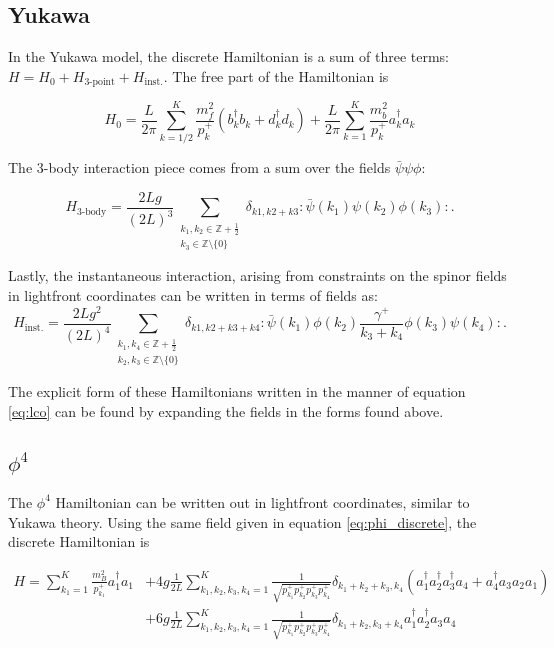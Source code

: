\subsection{Yukawa}
In the Yukawa model, the discrete Hamiltonian is a sum of three terms: $H = H_0 + H_{\text{3-point}} + H_{\text{inst.}}$.
The free part of the Hamiltonian is 

\begin{equation}
    H_0 = \frac{L}{2\pi}\sum_{k = 1/2}^K \frac{m_f^2}{p_k^+}\left(b_k^\dagger b_k + d_k^\dagger d_k \right) + \frac{L}{2\pi}\sum_{k = 1}^K \frac{m_b^2}{p_k^+}a_k^\dagger a_k 
\end{equation}

The 3-body interaction piece comes from a sum over the fields $\bar \psi \psi \phi$:

\begin{equation}
    H_{\text{3-body}} = \frac{2Lg}{(2L)^3}\sum_{\substack{k_1, k_2 \in \mathbb{Z} + \frac{1}{2} \\ k_3 \in \mathbb{Z} \setminus \{0\}}}
    \delta_{k1, k2 + k3}:\bar \psi(k_1)\psi(k_2)\phi(k_3):.
\end{equation}

Lastly, the instantaneous interaction, arising from constraints on the spinor fields in lightfront coordinates can be written in terms of fields as:
\begin{equation}
    H_{\text{inst.}} = \frac{2Lg^2}{(2L)^4}\sum_{\substack{k_1, k_4 \in \mathbb{Z} + \frac{1}{2} \\ k_2, k_3 \in \mathbb{Z} \setminus \{0\}}}
    \delta_{k1, k2 + k3 + k4}:\bar \psi(k_1)\phi(k_2)\frac{\gamma^+}{k_3 + k_4}\phi(k_3)\psi(k_4):.
\end{equation}

The explicit form of these Hamiltonians written in the manner of equation \ref{eq:lco} can be found by expanding the fields in the forms found above.

\subsection{$\phi^4$}
The $\phi^4$ Hamiltonian can be written out in lightfront coordinates, similar to Yukawa theory. Using the same field given in equation \ref{eq:phi_discrete}, the discrete Hamiltonian is


\begin{align}
    H = 
\sum_{k_1 = 1}^{K} \frac{m_B^2}{p_{k_1}^+} a_1^\dagger a_1
&+
4 g
\frac{1}{2L} \sum_{k_1, k_2, k_3, k_4 = 1}^{K}
\frac{1}{\sqrt{p_{k_1}^+ p_{k_2}^+ p_{k_3}^+ p_{k_4}^+}}
\delta_{k_1 + k_2 + k_3, k_4}
\left(
  a_1^\dagger a_2^\dagger a_3^\dagger a_4
+ a_4^\dagger a_3 a_2 a_1
\right)
\\ 
& +6 g
\frac{1}{2L} \sum_{k_1, k_2, k_3, k_4 = 1}^{K}
\frac{1}{\sqrt{p_{k_1}^+ p_{k_2}^+ p_{k_3}^+ p_{k_4}^+}}
\delta_{k_1 + k_2, k_3 + k_4}
a_1^\dagger a_2^\dagger a_3 a_4 \\ \nonumber
\end{align}